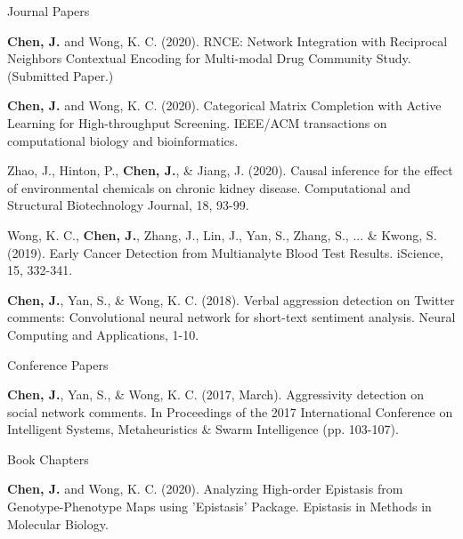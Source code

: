 

\begin{cventries}

\cventry
{}{Journal Papers}{}{} %
{
  \begin{cvitems} %
        \item \textbf{Chen, J.} and Wong, K. C. (2020). RNCE: Network Integration with Reciprocal Neighbors Contextual Encoding for Multi-modal Drug Community Study. (Submitted Paper.)
        \item \textbf{Chen, J.} and Wong, K. C. (2020). Categorical Matrix Completion with Active Learning for High-throughput Screening. IEEE/ACM transactions on computational biology and bioinformatics.
        \item Zhao, J., Hinton, P., \textbf{Chen, J.}, \& Jiang, J. (2020). Causal inference for the effect of environmental chemicals on chronic kidney disease. Computational and Structural Biotechnology Journal, 18, 93-99.
        \item Wong, K. C., \textbf{Chen, J.}, Zhang, J., Lin, J., Yan, S., Zhang, S., ... \& Kwong, S. (2019). Early Cancer Detection from Multianalyte Blood Test Results. iScience, 15, 332-341.
        \item \textbf{Chen, J.}, Yan, S., \& Wong, K. C. (2018). Verbal aggression detection on Twitter comments: Convolutional neural network for short-text sentiment analysis. Neural Computing and Applications, 1-10.      
    \end{cvitems}
}

\cventry
{}{Conference Papers}{}{} %
{
  \begin{cvitems} %
        \item \textbf{Chen, J.}, Yan, S., \& Wong, K. C. (2017, March). Aggressivity detection on social network comments. In Proceedings of the 2017 International Conference on Intelligent Systems, Metaheuristics \& Swarm Intelligence (pp. 103-107).   
    \end{cvitems}
}
\cventry
{}{Book Chapters}{}{} %
{
  \begin{cvitems} %
        \item \textbf{Chen, J.} and Wong, K. C. (2020). Analyzing High-order Epistasis from Genotype-Phenotype Maps using 'Epistasis' Package. Epistasis in Methods in Molecular Biology.
    \end{cvitems}
}
\end{cventries}
